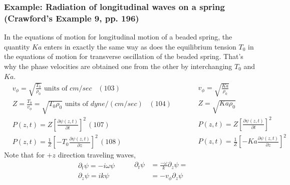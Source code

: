\documentclass[twoside, 10pt]{amsart}
\begin{document}
\subsubsection*{ Example: Radiation of longitudinal waves on a spring (Crawford's Example 9, pp. 196) }
In the equations of motion for longitudinal motion of a beaded spring, the quantity $Ka$ enters in exactly the same way as does the equilibrium tension $T_0$ in the equations of motion for transverse oscillation of the beaded spring.  That's why the phase velocities are obtained one from the other by interchanging $T_0$ and $Ka$.  
\[
\begin{aligned}
  & v_{\phi} = \sqrt{ \frac{T_0}{\rho_0} } \text{ units of $cm/sec$ } \, (103) \\
  & Z = \frac{T_0}{v_{\phi}} = \sqrt{ T_0 \rho_0} \text{ units of $dyne/(cm/sec)$ } \, (104) \\
  & P(z,t) = Z \left[ \frac{ \partial \psi(z,t)}{ \partial t } \right]^2 \, (107) \\
  & P(z,t) = \frac{1}{Z} \left[ -T_0 \frac{ \partial \psi(z,t) }{\partial z } \right]^2 \, (108) 
\end{aligned}
\quad \quad \, 
\begin{aligned}
  & v_{\phi} = \sqrt{ \frac{Ka}{\rho_0} } \\
  & Z = \sqrt{ Ka \rho_0 } \\
  & P(z,t) = Z \left[ \frac{ \partial \psi(z,t) }{ \partial t } \right]^2 \\
  & P(z,t) = \frac{1}{Z} \left[ -Ka \frac{ \partial \psi(z,t) }{ \partial z} \right]^2 
\end{aligned}
\]
Note that for $+z$ direction traveling waves, 
\[
\begin{aligned}
  & \partial_t \psi = -i\omega \psi \\
  & \partial_z \psi = i k \psi
\end{aligned} \quad \quad 
\begin{aligned}
  \partial_t \psi & = \frac{-\omega}{k} \partial_z \psi = \\
  & = -v_{\phi} \partial_z \psi
\end{aligned}
\]
\end{document}
